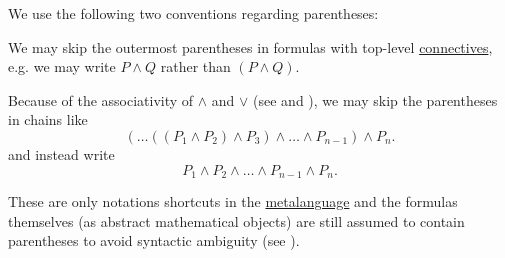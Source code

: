 \begin{remark}\label{rem:propositional_formula_parentheses}
  We use the following two conventions regarding parentheses:
  \begin{remenum}
     We may skip the outermost parentheses in formulas with top-level \hyperref[def:propositional_language/connectives]{connectives}, e.g. we may write \( P \wedge Q \) rather than \( (P \wedge Q) \).

     Because of the associativity of \( \wedge \) and \( \vee \) (see  and ), we may skip the parentheses in chains like
    \begin{equation*}
      ( \ldots ((P_1 \wedge P_2) \wedge P_3) \wedge \ldots \wedge P_{n-1} ) \wedge P_n.
    \end{equation*}
    and instead write
    \begin{equation*}
      P_1 \wedge P_2 \wedge \ldots \wedge P_{n-1} \wedge P_n.
    \end{equation*}
  \end{remenum}

  These are only notations shortcuts in the \hyperref[rem:metalanguage_syntax_and_semantics]{metalanguage} and the formulas themselves (as abstract mathematical objects) are still assumed to contain parentheses to avoid syntactic ambiguity (see ).
\end{remark}

